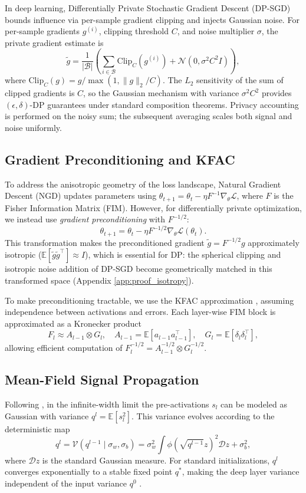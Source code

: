 \documentclass{article}
\theoremstyle{plain}
\theoremstyle{definition}
\theoremstyle{remark}
\begin{document}
In deep learning, Differentially Private Stochastic Gradient Descent (DP-SGD) \cite{Abadi_2016} bounds influence via per-sample gradient clipping and injects Gaussian noise. For per-sample gradients $g^{(i)}$, clipping threshold $C$, and noise multiplier $\sigma$, the private gradient estimate is
\[
\tilde{g} = \frac{1}{|\mathcal{B}|} \left( \sum_{i \in \mathcal{B}} \text{Clip}_C(g^{(i)}) + \mathcal{N}(0, \sigma^2 C^2 I) \right),
\]
where $\text{Clip}_C(g) = g / \max(1, \|g\|_2/C)$. The $L_2$ sensitivity of the sum of clipped gradients is $C$, so the Gaussian mechanism with variance $\sigma^2 C^2$ provides $(\epsilon,\delta)$-DP guarantees under standard composition theorems. Privacy accounting is performed on the noisy sum; the subsequent averaging scales both signal and noise uniformly.

\subsection{Gradient Preconditioning and KFAC}
To address the anisotropic geometry of the loss landscape, Natural Gradient Descent (NGD) \cite{Amari1998} updates parameters using $\theta_{t+1} = \theta_t - \eta F^{-1} \nabla_\theta \mathcal{L}$, where $F$ is the Fisher Information Matrix (FIM). However, for differentially private optimization, we instead use \textit{gradient preconditioning} with $F^{-1/2}$:
\[
\theta_{t+1} = \theta_t - \eta F^{-1/2} \nabla_\theta \mathcal{L}(\theta_t).
\]
This transformation makes the preconditioned gradient $\tilde{g} = F^{-1/2} g$ approximately isotropic ($\mathbb{E}[\tilde{g}\tilde{g}^\top] \approx I$), which is essential for DP: the spherical clipping and isotropic noise addition of DP-SGD become geometrically matched in this transformed space (Appendix \ref{app:proof_isotropy}).

To make preconditioning tractable, we use the KFAC approximation \cite{DBLP:journals/corr/MartensG15}, assuming independence between activations and errors. Each layer-wise FIM block is approximated as a Kronecker product
\[
F_l \approx A_{l-1} \otimes G_l, \quad
A_{l-1} = \mathbb{E}[a_{l-1} a_{l-1}^\top], \quad
G_l = \mathbb{E}[\delta_l \delta_l^\top],
\]
allowing efficient computation of $F_l^{-1/2} = A_{l-1}^{-1/2} \otimes G_l^{-1/2}$.

\subsection{Mean-Field Signal Propagation}
\label{subsec:mft_prelim}
Following \citet{poole2016exponential, schoenholz2016deep}, in the infinite-width limit the pre-activations $s_l$ can be modeled as Gaussian with variance $q^l = \mathbb{E}[s_l^2]$. This variance evolves according to the deterministic map
\[
q^l = \mathcal{V}(q^{l-1} \mid \sigma_w, \sigma_b) = \sigma_w^2 \int \phi(\sqrt{q^{l-1}} z)^2 \mathcal{D}z + \sigma_b^2,
\]
where $\mathcal{D}z$ is the standard Gaussian measure. For standard initializations, $q^l$ converges exponentially to a stable fixed point $q^*$, making the deep layer variance independent of the input variance $q^0$ \cite{poole2016exponential}.
\end{document}
